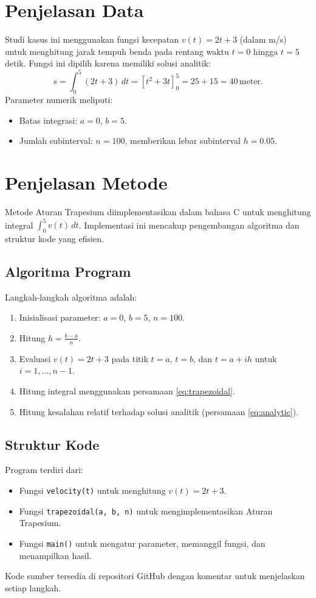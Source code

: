 \documentclass[conference]{IEEEtran}
\begin{document}
\section{Penjelasan Data}
Studi kasus ini menggunakan fungsi kecepatan \( v(t) = 2t + 3 \) (dalam m/s) untuk menghitung jarak tempuh benda pada rentang waktu \( t = 0 \) hingga \( t = 5 \) detik. Fungsi ini dipilih karena memiliki solusi analitik:
\begin{equation}
s = \int_0^5 (2t + 3) \, dt = \left[ t^2 + 3t \right]_0^5 = 25 + 15 = 40 \, \text{meter}.
\label{eq:analytic}
\end{equation}
Parameter numerik meliputi:
\begin{itemize}
    \item Batas integrasi: \( a = 0 \), \( b = 5 \).
    \item Jumlah subinterval: \( n = 100 \), memberikan lebar subinterval \( h = 0.05 \).
\end{itemize}

\section{Penjelasan Metode}
Metode Aturan Trapesium diimplementasikan dalam bahasa C untuk menghitung integral \( \int_0^5 v(t) \, dt \). Implementasi ini mencakup pengembangan algoritma dan struktur kode yang efisien.

\subsection{Algoritma Program}
Langkah-langkah algoritma adalah:
\begin{enumerate}
    \item Inisialisasi parameter: \( a = 0 \), \( b = 5 \), \( n = 100 \).
    \item Hitung \( h = \frac{b-a}{n} \).
    \item Evaluasi \( v(t) = 2t + 3 \) pada titik \( t = a \), \( t = b \), dan \( t = a + i h \) untuk \( i = 1, \ldots, n-1 \).
    \item Hitung integral menggunakan persamaan \eqref{eq:trapezoidal}.
    \item Hitung kesalahan relatif terhadap solusi analitik (persamaan \eqref{eq:analytic}).
\end{enumerate}

\subsection{Struktur Kode}
Program terdiri dari:
\begin{itemize}
    \item Fungsi \texttt{velocity(t)} untuk menghitung \( v(t) = 2t + 3 \).
    \item Fungsi \texttt{trapezoidal(a, b, n)} untuk mengimplementasikan Aturan Trapesium.
    \item Fungsi \texttt{main()} untuk mengatur parameter, memanggil fungsi, dan menampilkan hasil.
\end{itemize}
Kode sumber tersedia di repositori GitHub \cite{b2} dengan komentar untuk menjelaskan setiap langkah.
\end{document}
